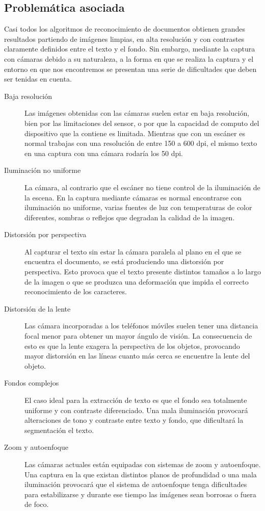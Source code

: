 \subsection{Problemática asociada}
Casi todos los algoritmos de reconocimiento de documentos obtienen grandes resultados partiendo de imágenes limpias, en alta resolución y con contrastes claramente definidos entre el texto y el fondo. Sin embargo, mediante la captura con cámaras debido a su naturaleza, a la forma en que se realiza la captura y el entorno en que nos encontremos se presentan una serie de dificultades que deben ser tenidas en cuenta.  
\begin{description}
\item[Baja resolución] Las imágenes obtenidas con las cámaras suelen estar en baja resolución, bien por las limitaciones del sensor, o por que la capacidad de computo del dispositivo que la contiene es limitada. Mientras que con un escáner es normal trabajas con una resolución de entre 150 a 600 dpi, el mismo texto en una captura con una cámara rodaría los 50 dpi.
\item[Iluminación no uniforme] La cámara, al contrario que el escáner no tiene control de la iluminación de la escena. En la captura mediante cámaras es normal encontrarse con iluminación no uniforme, varias fuentes de luz con temperaturas de color diferentes, sombras o reflejos que degradan la calidad de la imagen.
\item[Distorsión por perspectiva] Al capturar el texto sin estar la cámara paralela al plano en el que se encuentra el documento, se está produciendo una distorsión por perspectiva. Esto provoca que el texto presente distintos tamaños a lo largo de la imagen o que se produzca una deformación que impida el correcto reconocimiento de los caracteres. 
\item[Distorsión de la lente] Las cámara incorporadas a los teléfonos móviles suelen tener una distancia focal menor para obtener un mayor ángulo de visión. La consecuencia de esto es que la lente exagera la perspectiva de los objetos, provocando mayor distorsión en las líneas cuanto más cerca se encuentre la lente del objeto.
\item[Fondos complejos] El caso ideal para la extracción de texto es que el fondo sea totalmente uniforme y con contraste diferenciado. Una mala iluminación provocará alteraciones de tono y contraste entre texto y fondo, que dificultará la segmentación el texto. 
\item[Zoom y autoenfoque] Las cámaras actuales están equipadas con sistemas de zoom y autoenfoque. Una captura en la que existan distintos planos de profundidad o una mala iluminación provocará que el sistema de autoenfoque tenga dificultades para estabilizarse y durante ese tiempo las imágenes sean borrosas o fuera de foco.

\end{description}
